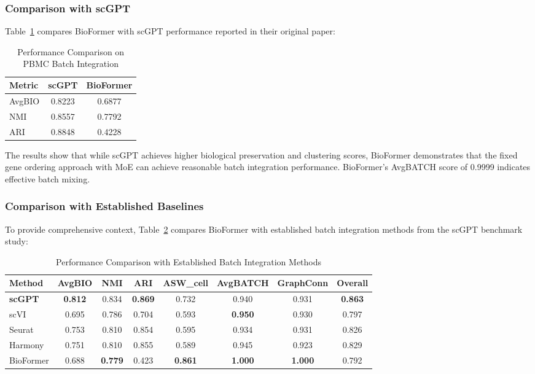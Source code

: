 \subsubsection{Comparison with scGPT}
Table~\ref{tab:performance_comparison} compares BioFormer with scGPT performance reported in their original paper:

\begin{table}[h]
\centering
\caption{Performance Comparison on PBMC Batch Integration}
\label{tab:performance_comparison}
\begin{tabular}{lcc}
\toprule
\textbf{Metric} & \textbf{scGPT} & \textbf{BioFormer} \\
\midrule
AvgBIO & 0.8223 & 0.6877 \\
NMI & 0.8557 & 0.7792 \\
ARI & 0.8848 & 0.4228 \\
\bottomrule
\end{tabular}
\end{table}

The results show that while scGPT achieves higher biological preservation and clustering scores, BioFormer demonstrates that the fixed gene ordering approach with MoE can achieve reasonable batch integration performance. BioFormer's AvgBATCH score of 0.9999 indicates effective batch mixing.

\subsubsection{Comparison with Established Baselines}

To provide comprehensive context, Table~\ref{tab:baseline_comparison} compares BioFormer with established batch integration methods from the scGPT benchmark study:

\begin{table}[h]
\centering
\caption{Performance Comparison with Established Batch Integration Methods}
\label{tab:baseline_comparison}
\begin{tabular}{lccccccc}
\toprule
\textbf{Method} & \textbf{AvgBIO} & \textbf{NMI} & \textbf{ARI} & \textbf{ASW\_cell} & \textbf{AvgBATCH} & \textbf{GraphConn} & \textbf{Overall} \\
\midrule
\textbf{scGPT} & \textbf{0.812} & 0.834 & \textbf{0.869} & 0.732 & 0.940 & 0.931 & \textbf{0.863} \\
scVI & 0.695 & 0.786 & 0.704 & 0.593 & \textbf{0.950} & 0.930 & 0.797 \\
Seurat & 0.753 & 0.810 & 0.854 & 0.595 & 0.934 & 0.931 & 0.826 \\
Harmony & 0.751 & 0.810 & 0.855 & 0.589 & 0.945 & 0.923 & 0.829 \\
\midrule
BioFormer & 0.688 & \textbf{0.779} & 0.423 & \textbf{0.861} & \textbf{1.000} & \textbf{1.000} & 0.792 \\
\bottomrule
\end{tabular}
\end{table}

